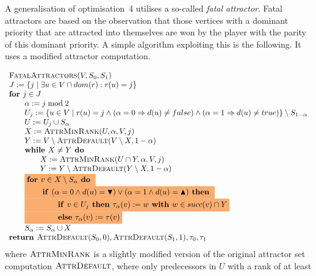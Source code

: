 \documentclass{article}
\newcommand{\If}{\text{\textbf{if }}}
\newcommand{\Do}{\text{\textbf{ do }}}
\newcommand{\Then}{\text{\textbf{ then }}}
\newcommand{\Else}{\text{\textbf{else }}}
\newcommand{\For}{\text{\textbf{for }}}
\newcommand{\While}{\text{\textbf{while }}}
\newcommand{\Return}{\text{\textbf{return }}}
\begin{document}
A generalisation of optimisation~4 utilises a so-called \emph{fatal attractor}. Fatal attractors are based on the
observation that those vertices with a dominant priority that are attracted into themselves are won by the player
with the parity of this dominant priority. A simple algorithm exploiting this is the following. It uses a modified
attractor computation.

\begin{equation*}
\begin{array}{l}
\text{\textsc{FatalAttractors}}(V, S_0, S_1)\\
J := \{ j \mid \exists u \in V \cap dom(r) : r(u) = j \} \\
\textbf{for } j \in J \\
\qquad \alpha := j \bmod 2\\
\qquad U_j := \{u \in V \mid r(u) = j \wedge (\alpha = 0 \Rightarrow d(u) \neq false) 
\wedge (\alpha = 1 \Rightarrow d(u) \neq true) \} \setminus S_{1 - \alpha} \\
\qquad U := U_j \cup S_\alpha\\
\qquad X := \textsc{AttrMinRank}(U, \alpha, V, j) \\
\qquad Y := V \setminus \textsc{AttrDefault}(V \setminus X, 1-\alpha) \\
\qquad \While X \neq Y \textbf{ do }\\
\qquad \qquad X := \textsc{AttrMinRank}(U \cap Y, \alpha, V, j) \\
\qquad \qquad Y := Y \setminus \textsc{AttrDefault}(Y \setminus X, 1-\alpha) \\
\qquad \colorbox{Apricot}{$ \For v \in X \setminus S_{\alpha} \Do $} \\
\qquad \colorbox{Apricot}{$ \qquad \If (\alpha = 0 \land d(u) = \blacktriangledown) \lor (\alpha = 1 \land d(u) = \blacktriangle) \Then $} \\
\qquad \colorbox{Apricot}{$ \qquad \qquad \If v \in U_j \Then \tau_{\alpha}(v) := w \textbf{ with } w \in succ(v) \cap Y $} \\
\qquad \colorbox{Apricot}{$ \qquad \qquad \Else \tau_{\alpha}(v) := \tau(v)$} \\
\qquad S_\alpha := S_\alpha \cup X \\
\Return \textsc{AttrDefault}(S_0, 0), \textsc{AttrDefault}(S_1, 1), \tau_0,\tau_1
\end{array}
\end{equation*}
where $\textsc{AttrMinRank}$ is a slightly modified version of the original attractor
set computation $\textsc{AttrDefault}$, where only predecessors in $U$ with a rank of at least
\end{document}
